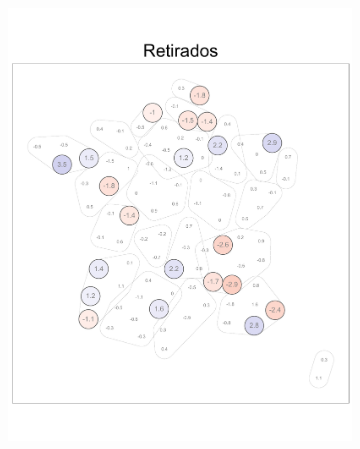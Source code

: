 \begin{figure}
\begin{subfigure}{0.235\textwidth}
	\includegraphics[width = \textwidth]{Figs/Efectos/Dorling_Efectos_CSP7_Modelo_H}
	\end{subfigure}
	~
	\begin{subfigure}{0.235\textwidth}

\end{subfigure}
\end{figure}
